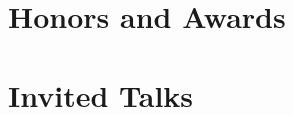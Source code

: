 \documentclass[11pt,letterpaper,serif]{moderncv} %
\newcounter{section} \setcounter{section}{1} \newtheorem{theorem}{Theorem}
\begin{document}
\nocite{yang2023,vasseur2023a,vasseur2023b,yang2022a,zhang2023,zhang2022,yang2022,vasseur2021,lin2020,yang2018}


% 
% 


% 

\section{Honors and Awards}

\newcommand{\honor}[4]{\cvitem{#3 #4}{#1, \textit{#2}}}




% 

\section{Invited Talks}

\newcommand{\talk}[6]{\cventry{\DTMdate{#2}}{\textnormal{#4}, \textnormal{\textit{#3}}}{}{}{}{#5}}%



% 


\end{document}
